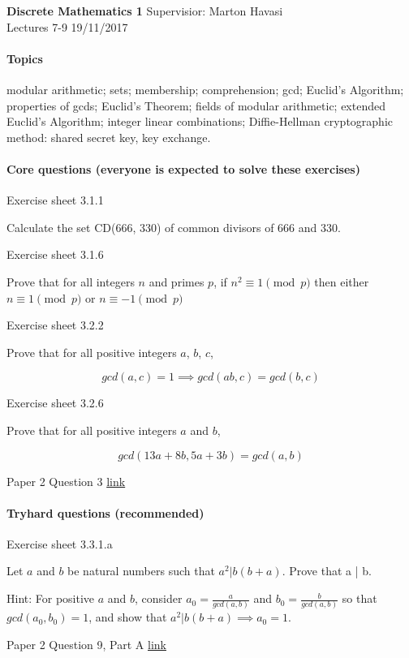 \documentclass{exam}
\begin{document}
\noindent
\large\textbf{Discrete Mathematics 1} \hfill Supervisior: Marton Havasi \\
\normalsize Lectures 7-9 \hfill 19/11/2017
\paragraph{Topics}

modular arithmetic; sets; membership; comprehension; gcd; Euclid's Algorithm; properties of gcds; Euclid's Theorem; fields of modular arithmetic; extended Euclid's Algorithm; integer linear combinations; Diffie-Hellman cryptographic method: shared secret key, key exchange.

\paragraph{Core questions (everyone is expected to solve these exercises)}
\begin{questions}
\question Exercise sheet 3.1.1

Calculate the set CD(666, 330) of common divisors of 666 and 330.

\question Exercise sheet 3.1.6

 Prove that for all integers $n$ and primes $p$, if $n^2 \equiv 1 \pmod{p}$ then either $n \equiv 1 \pmod{p}$ or $n \equiv -1 \pmod{p}$
 
\question Exercise sheet 3.2.2

Prove that for all positive integers $a$, $b$, $c$,

$$gcd(a, c) = 1 \implies gcd(a  b, c) = gcd(b, c)$$

\question Exercise sheet 3.2.6

Prove that for all positive integers $a$ and $b$,

$$gcd(13a + 8b , 5a + 3b)=gcd(a, b)$$ 


 Paper 2 Question 3 \href{http://www.cl.cam.ac.uk/teaching/exams/pastpapers/y2007p2q3.pdf}{link}

\end{questions}

\paragraph{Tryhard questions (recommended)}
\begin{questions}
\question Exercise sheet 3.3.1.a

 Let $a$ and $b$ be natural numbers such that $a^2 | b(b + a)$. Prove that a | b.
 
Hint: For positive $a$ and $b$, consider $a_0 =\frac{a}{gcd(a,b)}$ and $b_0 = \frac{b}{gcd(a,b)}$ so that $gcd(a_0, b_0) = 1$, and show
that $a^2| b(b + a) \implies a_0 = 1$. 
 
  Paper 2 Question 9, Part A \href{http://www.cl.cam.ac.uk/teaching/exams/pastpapers/y2015p2q9.pdf}{link}

\end{questions}
\end{document}

